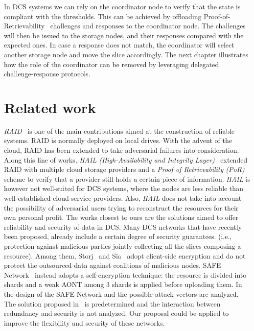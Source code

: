 {In DCS systems we can rely on the coordinator node to verify that the state is compliant with the thresholds. This can be achieved by offloading Proof-of-Retrievability~\cite{bowers2009proofs} challenges and responses to the coordinator node. The challenges will then be issued to the storage nodes, and their responses compared with the expected ones. In case a response does not match, the coordinator will select another storage node and move the slice accordingly.
%
The next chapter illustrates how the role of the coordinator can be removed by leveraging delegated challenge-response protocols.
}


\section{Related work}\label{dcs:sec:relwork}

{\em RAID}~\cite{Patterson:1988:CRA:971701.50214} is one of the main
contributions aimed at the construction of reliable systems.  RAID is
normally deployed on local drives.  With the advent of the cloud, RAID
has been extended to take adversarial failures into
consideration. Along this line of works, {\em HAIL (High-Availability
  and Integrity Layer)}~\cite{bowers2009hail} extended RAID with
multiple cloud storage providers and a {\em Proof of Retrievability
  (PoR)}~\cite{bowers2009proofs} scheme to verify that a provider
still holds a certain piece of information.  {\em HAIL} is however not
well-suited for DCS systems, where the nodes are less reliable than
well-established cloud service providers. Also, {\em HAIL} does not
take into account the possibility of adversarial users trying to
reconstruct the resources for their own personal profit.  The works
closest to ours are the solutions aimed to offer reliability and
security of data in DCS. Many DCS networks that have recently been
proposed, already include a certain degree of security guarantees.
(i.e., protection against malicious parties jointly collecting all the
slices composing a resource).  Among them,
Storj~\cite{wilkinson2014storj} and Sia~\cite{vorick2014sia} adopt
client-side encryption and do not protect the outsourced data against
coalitions of malicious nodes.  SAFE Network~\cite{irvine2010maidsafe}
instead adopts a self-encryption technique: the resource is divided
into shards and a weak AONT among 3 shards is applied before uploading
them.  In~\cite{paul2014security} the design of the SAFE Network and
the possible attack vectors are analyzed.  The solution proposed
in~\cite{irvine2010maidsafe,paul2014security} is predetermined and the
interaction between redundancy and security is not analyzed.  Our
proposal could be applied to improve the flexibility and security of
these networks.


